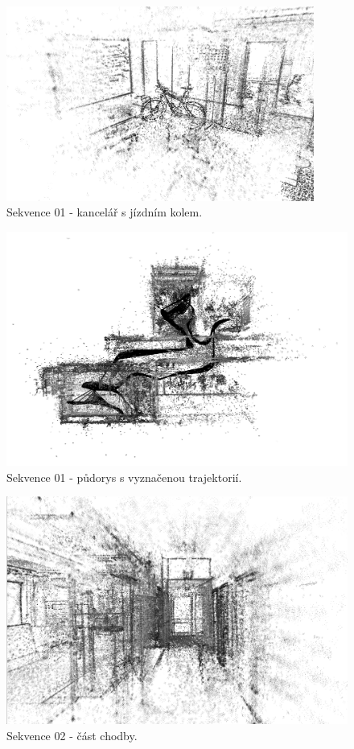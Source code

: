 \documentclass[12pt,a4paper]{report}
\begin{document}
\begin{figure}[H]
\centering
\includegraphics[width=0.9\textwidth]{img/LDSO_01_kolo.png}
\caption{Sekvence 01 - kancelář s jízdním kolem.}
\end{figure}

\begin{figure}[H]
\centering
\includegraphics[width=1\textwidth]{img/LDSO_01_top_b.png}
\caption{Sekvence 01 - půdorys s vyznačenou trajektorií.}
\end{figure}

\begin{figure}[H]
\centering
\includegraphics[width=1\textwidth]{img/LDSO_02_chodba.png}
\caption{Sekvence 02 - část chodby.}
\end{figure}
\end{document}
